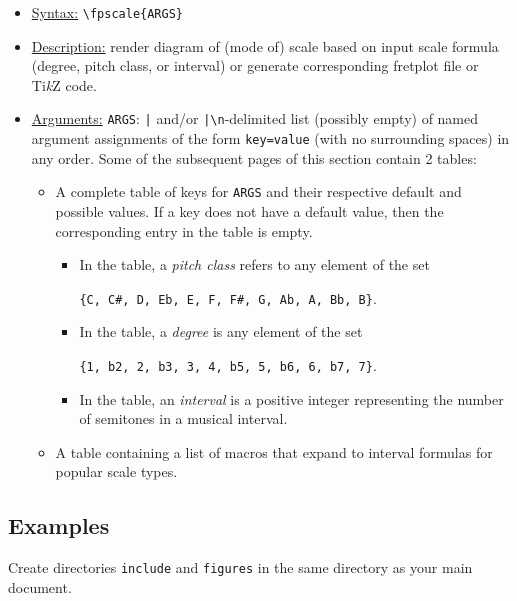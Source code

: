 \documentclass[12pt,letterpaper]{article}
\begin{document}
\begin{itemize}
  \item[] \uline{Syntax:} \texttt{\textbackslash fpscale\{ARGS\}}
  \item[] \uline{Description:} render diagram of (mode of) scale based on input scale formula (degree, pitch class, or interval) or generate corresponding fretplot file or Ti\textit{k}Z code.
  \item[] \uline{Arguments:} \texttt{ARGS}: \texttt{|} and/or \texttt{|\textbackslash n}-delimited list (possibly empty) of named argument assignments of the form \texttt{key=value} (with no surrounding spaces) in any order. Some of the subsequent pages of this section contain 2 tables:
    \begin{itemize}
    \item A complete table of keys for \texttt{ARGS} and their respective default and possible values. If a key does not have a default value, then the corresponding entry in the table is empty.
        \begin{itemize}
        \item In the table, a \textit{pitch class} refers to any element of the set
\begin{center}
\texttt{\{C, C\#, D, Eb, E, F, F\#, G, Ab, A, Bb, B\}}.
\end{center}
\item In the table, a \textit{degree} is any element of the set
\begin{center}
\texttt{\{1, b2, 2, b3, 3, 4, b5, 5, b6, 6, b7, 7\}}.
\end{center}
\item In the table, an \textit{interval} is a positive integer representing the number of semitones in a musical interval.
        \end{itemize}
    \item A table containing a list of macros that expand to interval formulas for popular scale types.
    \end{itemize}
\end{itemize}

\subsection{Examples}

Create directories \texttt{include} and \texttt{figures} in the same directory as your main document.
\end{document}
